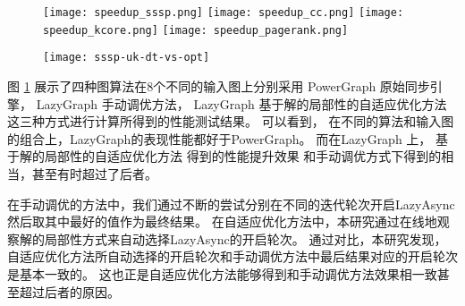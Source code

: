\begin{figure}[h]
	\centering
  \captionsetup{justification=centering}
	{\texttt{[image: speedup\_sssp.png]}}
  \hspace{4em}%
	{\texttt{[image: speedup\_cc.png]}}
	\hspace{4em}%
	{\texttt{[image: speedup\_kcore.png]}}
	\hspace{4em}%
	{\texttt{[image: speedup\_pagerank.png]}}
	\label{fig:speedup_four_algorithm}
\end{figure}


\begin{figure}[h]
  \centering
  \captionsetup{justification=centering}
  \texttt{[image: sssp-uk-dt-vs-opt]}
  \label{fig:dt-vs-opt}
\end{figure}

图 \ref{fig:speedup_four_algorithm} 展示了四种图算法在8个不同的输入图上分别采用
PowerGraph 原始同步引擎，
LazyGraph 手动调优方法，
LazyGraph 基于解的局部性的自适应优化方法
这三种方式进行计算所得到的性能测试结果。
可以看到，
在不同的算法和输入图的组合上，LazyGraph的表现性能都好于PowerGraph。
而在LazyGraph 上， 基于解的局部性的自适应优化方法
得到的性能提升效果
和手动调优方式下得到的相当，甚至有时超过了后者。

在手动调优的方法中，我们通过不断的尝试分别在不同的迭代轮次开启LazyAsync然后取其中最好的值作为最终结果。
在自适应优化方法中，本研究通过在线地观察解的局部性方式来自动选择LazyAsync的开启轮次。
通过对比，本研究发现，自适应优化方法所自动选择的开启轮次和手动调优方法中最后结果对应的开启轮次是基本一致的。
这也正是自适应优化方法能够得到和手动调优方法效果相一致甚至超过后者的原因。




